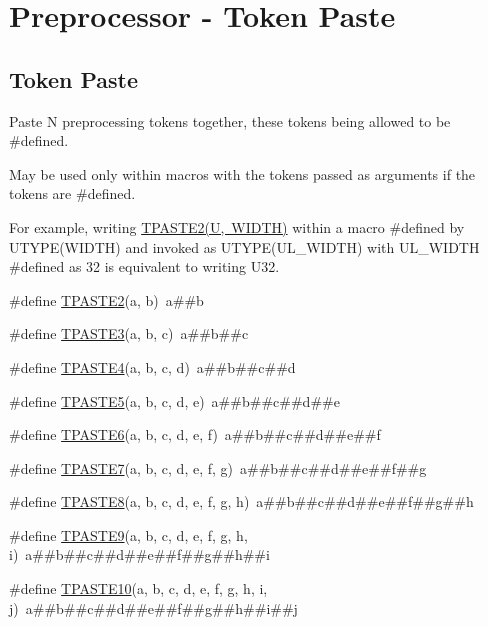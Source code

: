 \hypertarget{group__group__sam0__utils__tpaste}{}\section{Preprocessor -\/ Token Paste}
\label{group__group__sam0__utils__tpaste}
\subsection*{Token Paste}
\label{_amgrp95fd98b9acf33b4f1f1cfa86699bc1f2}%
Paste N preprocessing tokens together, these tokens being allowed to be \#defined.

May be used only within macros with the tokens passed as arguments if the tokens are \#defined.

For example, writing \mbox{\hyperlink{group__group__sam0__utils__tpaste_ga55fb148844f5ba993a992b609728e82e}{T\+P\+A\+S\+T\+E2(\+U, W\+I\+D\+T\+H)}} within a macro \#defined by U\+T\+Y\+P\+E(\+W\+I\+D\+T\+H) and invoked as U\+T\+Y\+P\+E(\+U\+L\+\_\+\+W\+I\+D\+T\+H) with U\+L\+\_\+\+W\+I\+D\+TH \#defined as 32 is equivalent to writing U32. \begin{DoxyCompactItemize}
\item 
\#define \mbox{\hyperlink{group__group__sam0__utils__tpaste_ga55fb148844f5ba993a992b609728e82e}{T\+P\+A\+S\+T\+E2}}(a,  b)~a\#\#b
\item 
\#define \mbox{\hyperlink{group__group__sam0__utils__tpaste_ga3774e5e321825e6ab4a27fef2a0deb14}{T\+P\+A\+S\+T\+E3}}(a,  b,  c)~a\#\#b\#\#c
\item 
\#define \mbox{\hyperlink{group__group__sam0__utils__tpaste_ga7df52ac8ee04480944ef404ef9418b38}{T\+P\+A\+S\+T\+E4}}(a,  b,  c,  d)~a\#\#b\#\#c\#\#d
\item 
\#define \mbox{\hyperlink{group__group__sam0__utils__tpaste_gac9624b958617cbb3281de7ec41f53230}{T\+P\+A\+S\+T\+E5}}(a,  b,  c,  d,  e)~a\#\#b\#\#c\#\#d\#\#e
\item 
\#define \mbox{\hyperlink{group__group__sam0__utils__tpaste_ga2c4dbcf9049d7553366bbf9b9bc4e801}{T\+P\+A\+S\+T\+E6}}(a,  b,  c,  d,  e,  f)~a\#\#b\#\#c\#\#d\#\#e\#\#f
\item 
\#define \mbox{\hyperlink{group__group__sam0__utils__tpaste_gad36c0d6224338a4f8738aa25659afc14}{T\+P\+A\+S\+T\+E7}}(a,  b,  c,  d,  e,  f,  g)~a\#\#b\#\#c\#\#d\#\#e\#\#f\#\#g
\item 
\#define \mbox{\hyperlink{group__group__sam0__utils__tpaste_gaf7aff743d5c0d66a81a13268b1a7e222}{T\+P\+A\+S\+T\+E8}}(a,  b,  c,  d,  e,  f,  g,  h)~a\#\#b\#\#c\#\#d\#\#e\#\#f\#\#g\#\#h
\item 
\#define \mbox{\hyperlink{group__group__sam0__utils__tpaste_ga5440e5a665d859bec7c3527312d0889d}{T\+P\+A\+S\+T\+E9}}(a,  b,  c,  d,  e,  f,  g,  h,  i)~a\#\#b\#\#c\#\#d\#\#e\#\#f\#\#g\#\#h\#\#i
\item 
\#define \mbox{\hyperlink{group__group__sam0__utils__tpaste_ga0235b2e4ccf7a5b1d022a729a17a78a2}{T\+P\+A\+S\+T\+E10}}(a,  b,  c,  d,  e,  f,  g,  h,  i,  j)~a\#\#b\#\#c\#\#d\#\#e\#\#f\#\#g\#\#h\#\#i\#\#j
\end{DoxyCompactItemize}
